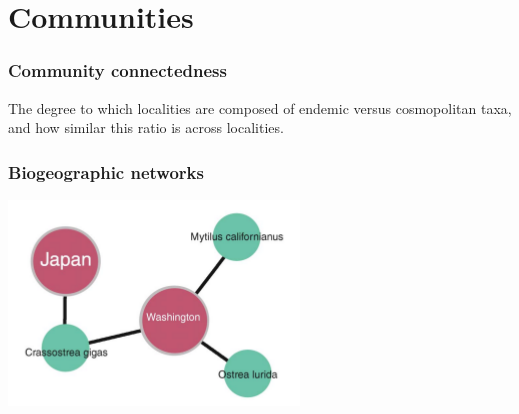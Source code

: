 \documentclass{beamer}
\begin{document}
%
%


\section{Communities}

\begin{frame}
  \frametitle{Community connectedness}
  \begin{definition}
    The degree to which localities are composed of endemic versus cosmopolitan taxa, and how similar this ratio is across localities.
  \end{definition}
\end{frame}

\begin{frame}
  \frametitle{Biogeographic networks}
  \begin{center}
    \includegraphics[height = 0.6\textheight, width = \textwidth, keepaspectratio = true]{figure/vilhena}  %

    \tiny{}
  \end{center}
\end{frame}
\end{document}
